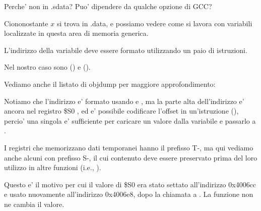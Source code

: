 Perche' non in .sdata? Puo' dipendere da qualche opzione di GCC?

Ciononostante $x$ si trova in .data, e possiamo vedere come si lavora con variabili localizzate in questa area di memoria generica.


L'indirizzo della variabile deve essere formato utilizzando un paio di istruzioni.

Nel nostro caso sono  () e  ().

Vediamo anche il listato di objdump per maggiore approfondimento:




Notiamo che l'indirizzo e' formato usando  e , ma la parte alta dell'indirizzo e' ancora nel registro
\$S0 , ed e' possibile codificare l'offset in un'istruzione  (), percio' una singola  e' sufficiente 
per caricare un valore dalla variabile e passarlo a \printf.

I registri che memorizzano dati temporanei hanno il prefisso T-, ma qui vediamo anche alcuni con prefisso S-, il cui contenuto deve essere preservato prima del loro
utilizzo in altre funzioni (i.e., ).

Questo e' il motivo per cui il valore di \$S0 era stato settato all'indirizzo 0x4006cc e usato nuovamente all'indirizzo 0x4006e8, dopo la chiamata a \scanf. 
La funzione \scanf non ne cambia il valore.

